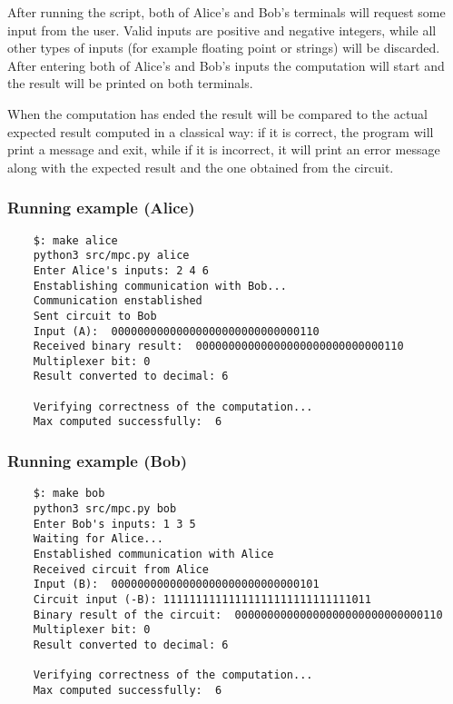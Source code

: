 After running the script, both of Alice's and Bob's terminals will request some input from the user. Valid inputs are positive and negative integers, while all other types of inputs (for example floating point or strings) will be discarded. After entering both of Alice's and Bob's inputs the computation will start and the result will be printed on both terminals. 

When the computation has ended the result will be compared to the actual expected result computed in a classical way: if it is correct, the program will print a message and exit, while if it is incorrect, it will print an error message along with the expected result and the one obtained from the circuit.

\subsubsection{Running example (Alice)}

\begin{lstlisting}
    $: make alice
    python3 src/mpc.py alice
    Enter Alice's inputs: 2 4 6
    Enstablishing communication with Bob...
    Communication enstablished
    Sent circuit to Bob
    Input (A):  00000000000000000000000000000110
    Received binary result:  00000000000000000000000000000110
    Multiplexer bit: 0
    Result converted to decimal: 6

    Verifying correctness of the computation...
    Max computed successfully:  6
\end{lstlisting}

\subsubsection{Running example (Bob)}

\begin{lstlisting}
    $: make bob
    python3 src/mpc.py bob
    Enter Bob's inputs: 1 3 5
    Waiting for Alice...
    Enstablished communication with Alice
    Received circuit from Alice
    Input (B):  00000000000000000000000000000101
    Circuit input (-B): 11111111111111111111111111111011
    Binary result of the circuit:  00000000000000000000000000000110
    Multiplexer bit: 0
    Result converted to decimal: 6

    Verifying correctness of the computation...
    Max computed successfully:  6
\end{lstlisting}